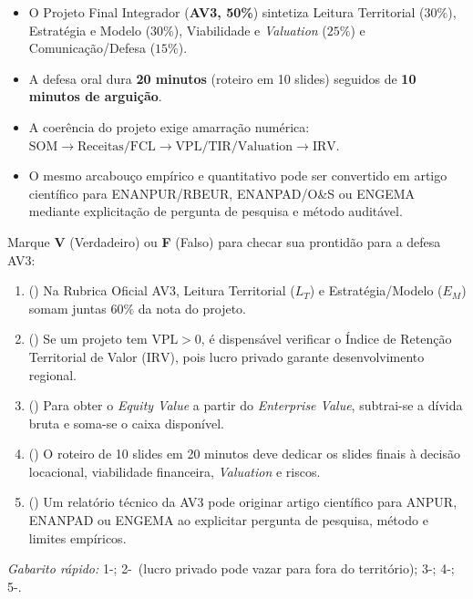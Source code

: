 \begin{boxResumo}
\begin{itemize}[leftmargin=1.4em, itemsep=2pt]
  \item O Projeto Final Integrador (\textbf{AV3, 50\%}) sintetiza Leitura Territorial ($30\%$), Estratégia e Modelo ($30\%$), Viabilidade e \textit{Valuation} ($25\%$) e Comunicação/Defesa ($15\%$).
  \item A defesa oral dura \textbf{20 minutos} (roteiro em 10 slides) seguidos de \textbf{10 minutos de arguição}.
  \item A coerência do projeto exige amarração numérica: $\text{SOM} \to \text{Receitas/FCL} \to \text{VPL/TIR/Valuation} \to \text{IRV}$.
  \item O mesmo arcabouço empírico e quantitativo pode ser convertido em artigo científico para ENANPUR/RBEUR, ENANPAD/O\&S ou ENGEMA mediante explicitação de pergunta de pesquisa e método auditável.
\end{itemize}
\end{boxResumo}

\begin{boxTeste}
Marque \textbf{V} (Verdadeiro) ou \textbf{F} (Falso) para checar sua prontidão para a defesa AV3:
\begin{enumerate}[leftmargin=1.5em, itemsep=2pt]
  \item (\quad) Na Rubrica Oficial AV3, Leitura Territorial ($L_T$) e Estratégia/Modelo ($E_M$) somam juntas $60\%$ da nota do projeto.
  \item (\quad) Se um projeto tem $\text{VPL} > 0$, é dispensável verificar o Índice de Retenção Territorial de Valor ($\text{IRV}$), pois lucro privado garante desenvolvimento regional.
  \item (\quad) Para obter o \textit{Equity Value} a partir do \textit{Enterprise Value}, subtrai-se a dívida bruta e soma-se o caixa disponível.
  \item (\quad) O roteiro de 10 slides em 20 minutos deve dedicar os slides finais à decisão locacional, viabilidade financeira, \textit{Valuation} e riscos.
  \item (\quad) Um relatório técnico da AV3 pode originar artigo científico para ANPUR, ENANPAD ou ENGEMA ao explicitar pergunta de pesquisa, método e limites empíricos.
\end{enumerate}
\footnotesize\textit{Gabarito rápido:} 1-\V; 2-\F\ (lucro privado pode vazar para fora do território); 3-\V; 4-\V; 5-\V.
\end{boxTeste}

